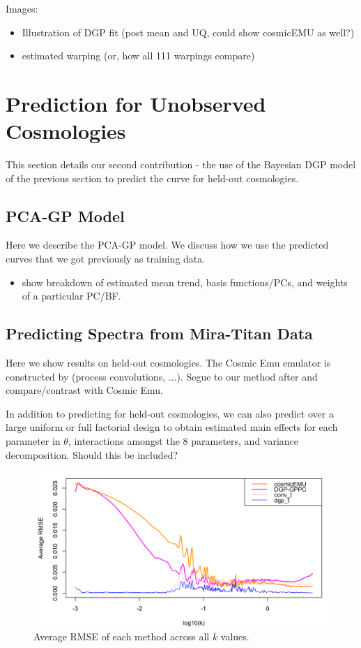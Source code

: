 \documentclass[11pt]{article}
\begin{document}
Images:
\begin{itemize}
    \item Illustration of DGP fit (post mean and UQ, could show cosmicEMU as well?)
    \item estimated warping (or, how all 111 warpings compare)
\end{itemize}


\section{Prediction for Unobserved Cosmologies}
\label{sec:pred}

This section details our second contribution - the use of the Bayesian DGP model of the previous section to predict the curve for held-out cosmologies.

\subsection{PCA-GP Model}
\label{subsec:pca}

Here we describe the PCA-GP model.  We discuss how we use the predicted curves that we got previously as training data. \cite{higdon2008computer, higdon2010estcosmo}

\begin{itemize}
    \item show breakdown of estimated mean trend, basis functions/PCs, and weights of a particular PC/BF.
\end{itemize}

\subsection{Predicting Spectra from Mira-Titan Data}
\label{subsec:mira_pred}

Here we show results on held-out cosmologies.  The Cosmic Emu emulator is constructed by (process convolutions, ...). Segue to our method after and compare/contrast with Cosmic Emu. 

In addition to predicting for held-out cosmologies, we can also predict over a large uniform or full factorial design to obtain estimated main effects for each parameter in $\theta$, interactions amongst the 8 parameters, and variance decomposition. Should this be included?

\begin{figure}[ht]
    \centering
    \includegraphics[width=6in]{rmse_by_k.png}
    \caption{Average RMSE of each method across all $k$ values.}
    \label{fig:plot_rmse_k}
\end{figure}
\end{document}
